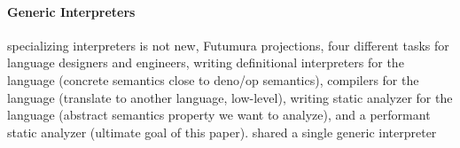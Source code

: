 \paragraph{Generic Interpreters}

specializing interpreters is not new, Futumura projections, four different tasks
for language designers and engineers, writing definitional interpreters for the
language (concrete semantics close to deno/op semantics), compilers for the
language (translate to another language, low-level), writing static analyzer for
the language (abstract semantics property we want to analyze), and a performant
static analyzer (ultimate goal of this paper). shared a single generic
interpreter

\iffalse
On the other side, static analysis is a tradeoff between performance and
precision: higher precision usually leads to longer running time.

4. Existing method to improve the performance is adhoc, engineering heavy, require to rewrite the optimized version, therefore harder to reason about the correctness
6. program analyzers are also meta-programs, they manipulate other programs as data objects
\fi